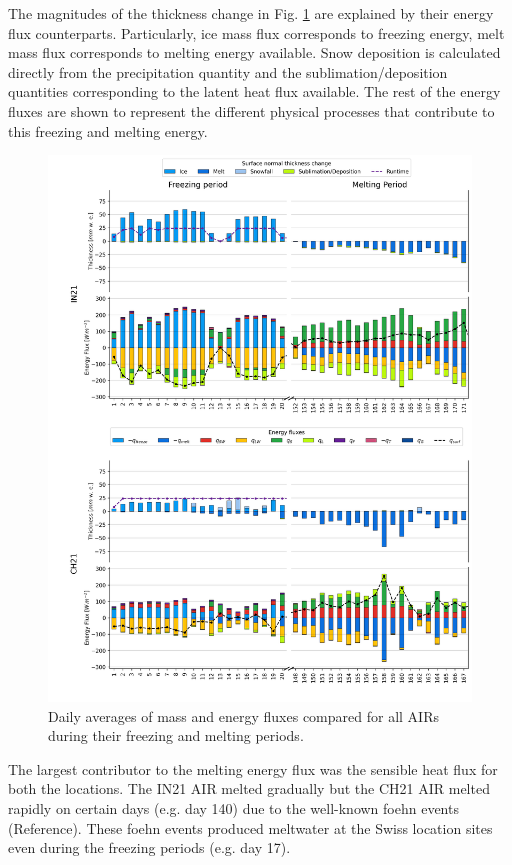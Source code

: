 \documentclass[utf8]{frontiersSCNS} %
\begin{document}
The magnitudes of the thickness change in Fig. \ref{fig:MEB} are explained by their energy flux counterparts.
Particularly, ice mass flux corresponds to freezing energy, melt mass flux corresponds to melting energy available.
Snow deposition is calculated directly from the precipitation quantity and the sublimation/deposition quantities
corresponding to the latent heat flux available. The rest of the energy fluxes are shown to represent the different
physical processes that contribute to this freezing and melting energy.

\begin{figure}
	\begin{center}
		\includegraphics[width=\linewidth]{Figures/mass_energy_bal.jpg} \end{center}
	\caption{Daily averages of mass and energy fluxes compared for all AIRs during their freezing and melting periods.
	} \label{fig:MEB}
\end{figure}

The largest contributor to the melting energy flux was the sensible heat flux for both the locations. The IN21
AIR melted gradually but the CH21 AIR melted rapidly on certain days (e.g.  day 140) due to the well-known foehn
events (Reference). These foehn events produced meltwater at the Swiss location sites even during the freezing periods
(e.g.  day 17).
\end{document}
